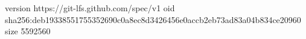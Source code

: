 version https://git-lfs.github.com/spec/v1
oid sha256:deb19338551755352690c0a8ec8d3426456e0accb2eb73ad83a04b834ce20960
size 5592560

